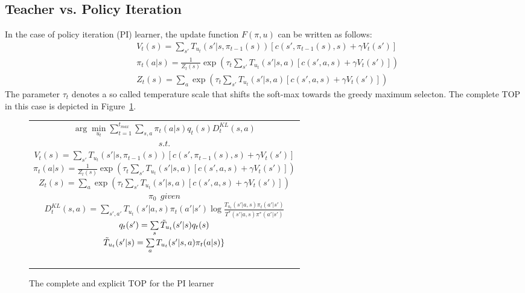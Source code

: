 \documentclass[letterpaper]{aamas2009}
\begin{document}
\subsection{Teacher vs. Policy Iteration}
In the case of policy iteration (PI) learner, the update function
$F(\pi,u)$ can be written as follows:
\begin{eqnarray*}
&V_t(s)=\sum\limits_{s'}T_{u_t}(s'|s,\pi_{t-1}(s))\left[
c(s',\pi_{t-1}(s),s)+\gamma V_t(s')
\right]\\
&\pi_t(a|s)=\frac{1}{Z_t(s)}\exp\left(\tau_t\sum\limits_{s'}T_{u_t}(s'|s,a)\left[
c(s',a,s)+\gamma V_t(s')
\right]\right)\\
&Z_t(s)=\sum\limits_a\exp\left(\tau_t\sum\limits_{s'}T_{u_t}(s'|s,a)\left[
c(s',a,s)+\gamma V_t(s')
\right]\right)
\end{eqnarray*}
The parameter $\tau_t$ denotes a so called temperature scale that
shifts the soft-max towards the greedy maximum selecton. The complete
TOP in this case is depicted in Figure~\ref{t_opt_PI}.
\begin{figure}[th]
\begin{tabular}{|c|} \hline \parbox{3.2 in} {\center 
$\arg\min\limits_{u_t}\sum\limits_{t=1}^{t_{max}}\sum\limits_{s,a}\pi_t(a|s)q_t(s)D^{KL}_t(s,a)$\\
$s.t.$\\
$V_t(s)=\sum\limits_{s'}T_{u_t}(s'|s,\pi_{t-1}(s))\left[
c(s',\pi_{t-1}(s),s)+\gamma V_t(s')
\right]$\\
$\pi_t(a|s)=\frac{1}{Z_t(s)}\exp\left(\tau_t\sum\limits_{s'}T_{u_t}(s'|s,a)\left[
c(s',a,s)+\gamma V_t(s')
\right]\right)$\\
$Z_t(s)=\sum\limits_a\exp\left(\tau_t\sum\limits_{s'}T_{u_t}(s'|s,a)\left[
c(s',a,s)+\gamma V_t(s')
\right]\right)$\\
$\pi_0\ \ \displaystyle{given}$\\
$D^{KL}_t(s,a)=\sum\limits_{s',a'}T_{u_t}(s'|a,s)\pi_t(a'|s')\log\frac{T_{u_t}(s'|a,s)\pi_t(a'|s')}{T^*(s'|a,s)\pi^*(a'|s')}$\\
$q_t(s')=\sum\limits_s\Tilde{T}_{u_t}(s'|s)q_t(s)$\\
$\Tilde{T}_{u_t}(s'|s)=\sum\limits_aT_{u_t}(s'|s,a)\pi_t(a|s)\}$\\\ \\
}\\ \hline \end{tabular}
\caption{\label{t_opt_PI}The complete and explicit TOP for the PI learner}
\end{figure}
\end{document}
